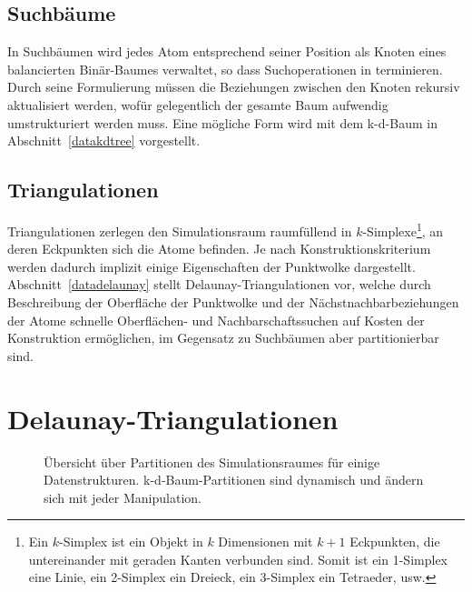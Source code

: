 \subsection{Suchbäume}
In Suchbäumen wird jedes Atom entsprechend seiner Position als Knoten eines balancierten Binär-Baumes verwaltet, so dass Suchoperationen in  terminieren.
Durch seine Formulierung müssen die Beziehungen zwischen den Knoten rekursiv aktualisiert werden, wofür gelegentlich der gesamte Baum aufwendig umstrukturiert werden muss.
Eine mögliche Form wird mit dem k-d-Baum in Abschnitt~\ref{datakdtree} vorgestellt.

\subsection{Triangulationen}
Triangulationen zerlegen den Simulationsraum raumfüllend in $k$-Simplexe\footnote{Ein $k$-Simplex ist ein Objekt in $k$ Dimensionen mit $k+1$ Eckpunkten, die untereinander mit geraden Kanten verbunden sind.
  Somit ist ein 1-Simplex eine Linie, ein 2-Simplex ein Dreieck, ein 3-Simplex ein Tetraeder, usw.}, an deren Eckpunkten sich die Atome befinden.
Je nach Konstruktionskriterium werden dadurch implizit einige Eigenschaften der Punktwolke dargestellt.
Abschnitt~\ref{datadelaunay} stellt Delaunay-Triangulationen vor, welche durch Beschreibung der Oberfläche der Punktwolke und der Nächstnachbarbeziehungen der Atome schnelle Oberflächen- und Nachbarschaftssuchen auf Kosten der Konstruktion ermöglichen, im Gegensatz zu Suchbäumen aber partitionierbar sind.

\section{Delaunay-Triangulationen}
\label{appendix_delaunay}

\begin{figure}[!ht]
  \caption[Übersicht über Partitionen des Simulationsraumes]{
    Übersicht über Partitionen des Simulationsraumes für einige Datenstrukturen.
    k-d-Baum-Partitionen sind dynamisch und ändern sich mit jeder Manipulation.
  }
  \label{fig:datastructures}
\end{figure}

